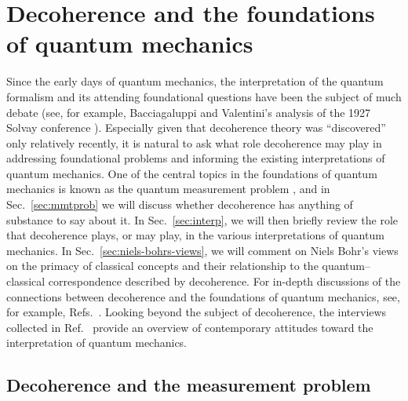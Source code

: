 \documentclass[3p,sort&compress]{elsarticle}
\begin{document}
\section{\label{sec:impl-found-quant}Decoherence and the foundations of quantum mechanics}

Since the early days of quantum mechanics, the interpretation of the quantum formalism and its attending foundational questions have been the subject of much debate (see, for example, Bacciagaluppi and Valentini's analysis of the 1927 Solvay conference \cite{Bacciagaluppi:2006:yq}).  Especially given that decoherence theory was ``discovered'' only relatively recently, it is natural to ask what role decoherence may play in addressing foundational problems and informing the existing interpretations of quantum mechanics. One of the central topics in the foundations of quantum mechanics is known as the quantum measurement problem \cite{Bub:1997:iq,Wigner:1963:yt,Fine:1970:iq,Schlosshauer:2003:tv,Wallace:2008:ii,Schlosshauer:2011:ee}, and in Sec.~\ref{sec:mmtprob} we will discuss whether decoherence has anything of substance to say about it. In Sec.~\ref{sec:interp}, we will then briefly review the role that decoherence plays, or may play, in the various interpretations of quantum mechanics. In Sec.~\ref{sec:niels-bohrs-views}, we will comment on Niels Bohr's views on the primacy of classical concepts and their relationship to the quantum--classical correspondence described by decoherence. For in-depth discussions of the connections between decoherence and the foundations of quantum mechanics, see, for example, Refs.~\cite{Bacciagaluppi:2003:yz,Schlosshauer:2003:tv,Schlosshauer:2006:rw,Schlosshauer:2007:un}. Looking beyond the subject of decoherence, the interviews collected in Ref.~\cite{Schlosshauer:2011:ee} provide an overview of contemporary attitudes toward the interpretation of quantum mechanics.

\subsection{Decoherence and the measurement problem\label{sec:mmtprob}}
\end{document}
